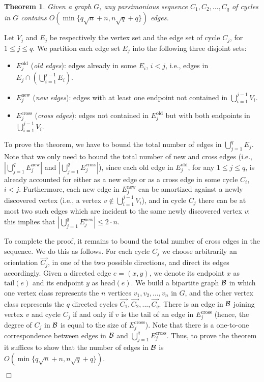 \documentclass{article}
\newcommand{\tail}          {\mathrm{tail}}
\newcommand{\head}          {\mathrm{head}}
\newtheorem{theorem}{Theorem}
\newcommand{\qed}{\hfill \ensuremath{\Box}}
\newenvironment{proof}{\vspace{1ex}\noindent{\bf Proof.}\hspace{0.5em}}
	{\hfill\qed\vspace{2ex}}
\newcommand{\round}[1]       {\left( #1 \right)}
\begin{document}
\begin{theorem}\label{th:smallcycles}
Given a graph $G$, any parsimonious sequence $C_1, C_2, \ldots, C_q$ of cycles in $G$ contains $O(\min\{q \sqrt{n}+n, n \sqrt{q}+q\})$ edges. 
\end{theorem}
\begin{proof}
Let $V_j$ and $E_j$ be respectively the vertex set and the edge set of cycle $C_j$, for $1 \leq j \leq q$. 
We partition each edge set $E_j$ into the following three disjoint sets:
\begin{itemize}
\item \label{oldedges} $E_j^{\mathrm{old}}$ (\emph{old edges}):  
edges already in some $E_i$, $i < j$, i.e., edges in $E_j \cap \round{ \bigcup_{i =1}^{j-1} E_i }$.

\item \label{newnodes} $E_j^{\mathrm{new}}$ (\emph{new edges}): edges with at least one endpoint not contained in $\bigcup_{i =1}^{j-1} V_i$. 

\item \label{oldnodes} $E_j^{\mathrm{cross}}$ (\emph{cross edges}): edges not contained in $E_j^{\mathrm{old}}$ but with both endpoints in $\bigcup_{i =1}^{j-1} V_i$.
\end{itemize}
To prove the theorem, we have to bound the total number of edges in $\bigcup_{j=1}^{q} E_j$.
Note that we only need to bound the total number of new and cross edges (i.e., $|\bigcup_{j =1}^{q} E_j^{\mathrm{new}}|$ and $|\bigcup_{j =1}^{q} E_j^{\mathrm{cross}}|$), since each old edge in $E_j^{\mathrm{old}}$, for any $1\leq j \leq q$, is already accounted for either as a new edge or as a cross edge in some cycle $C_i$,  $i < j$.
Furthermore, each new edge in $E_j^{\mathrm{new}}$ can be amortized against a newly discovered vertex (i.e., a vertex $v\not\in\bigcup_{i =1}^{j-1} V_i$), and in cycle $C_j$ there can be at most two such edges which are incident to the same newly discovered vertex $v$: this implies that
$|\bigcup_{j =1}^{q} E_j^{\mathrm{new}}| \leq 2 \cdot n.$

To complete the proof, it remains to bound the total number of cross edges in the sequence.
We do this as follows. 
For each cycle $C_j$ we choose arbitrarily an orientation $\overrightarrow{C_j}$,  in one of the two possible directions, and direct its edges accordingly. Given a directed edge $e = (x,y)$, we denote its endpoint $x$ as $\tail(e)$ and its endpoint $y$ as $\head(e)$.
We build a bipartite graph $\cal{B}$ in which one vertex class represents the $n$ vertices $v_1, v_2, \ldots, v_n$ in $G$, and the other vertex class represents the $q$ directed cycles $\overrightarrow{C_1}, \overrightarrow{C_2}, ..., \overrightarrow{C_{q}}$.
There is an edge in $\cal{B}$ joining vertex $v$ and cycle $C_j$  if and only if $v$ is the tail of an edge in $E_j^{\mathrm{cross}}$ (hence, the degree of $C_j$ in $\cal{B}$ is equal to the size of $E_j^{\mathrm{cross}}$). 
Note that there is a one-to-one correspondence between edges in $\cal{B}$ and  $\bigcup_{j =1}^{q} E_j^{\mathrm{cross}}$. Thus, 
 to prove the theorem it suffices to show that the number of edges in  $\cal{B}$  is $O(\min\{q \sqrt{n}+n, n \sqrt{q}+q\})$. 


\end{proof}
\end{document}
